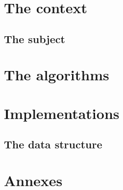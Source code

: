 \documentclass[12pt]{report}
\begin{document}


%



\begin{abstract}

\end{abstract}

\tableofcontents
\listoffigures





\part{The context}
\chapter{The subject}

\part{The algorithms}




\part{Implementations}
\chapter{The data structure}






\part{Annexes}
\appendix

\end{document}

